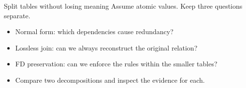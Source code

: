 \begin{frame}[t]{Split tables without losing meaning}
Assume atomic values. Keep three questions separate.
\medskip
\begin{itemize}
\item Normal form: which dependencies cause redundancy?
\item Lossless join: can we always reconstruct the original relation?
\item FD preservation: can we enforce the rules within the smaller tables?
\item Compare two decompositions and inspect the evidence for each.
\end{itemize}
\end{frame}
